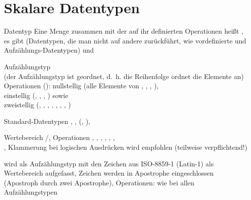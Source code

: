 \pagebreak

\section{%
    Skalare Datentypen%
}

\begin{Def}{Datentyp}
    Eine Menge zusammen mit der auf ihr definierten Operationen heißt
    , es gibt  (Datentypen, die man nicht
    auf andere zurückführt, wie vordefinierte und Aufzählungs-Datentypen) und
\end{Def}

\begin{Def}{Aufzählungstyp}
     \\
    (der Aufzählungstyp ist geordnet, d.~h. die Reihenfolge ordnet die Elemente
    an) \\
    Operationen (): nullstellig (alle Elemente von
    , , , ), \\
    einstellig (, ,
    , ) sowie \\
    zweistellig (\adacode{=}, \adacode{/=}, \adacode{<}, \adacode{<=},
    \adacode{>}, \adacode{>=}, , )
\end{Def}

\begin{Def}{Standard-Datentypen}
    ,
    ,
     (, ),
\end{Def}

\begin{Def}{}
    Wertebereich /,
    Operationen , , , ,
    \adacode{=}, ,\\
    ,
    Klammerung bei logischen Ausdrücken wird empfohlen
    (teilweise verpflichtend!)
\end{Def}

\begin{Def}{}
    wird als Aufzählungstyp mit den Zeichen aus ISO-8859-1 (Latin-1)
    als Wertebereich aufgefasst, Zeichen werden in Apostrophe eingeschlossen
    (Apostroph durch zwei Apostrophe),
    Operationen: wie bei allen Aufzählungstypen
\end{Def}

